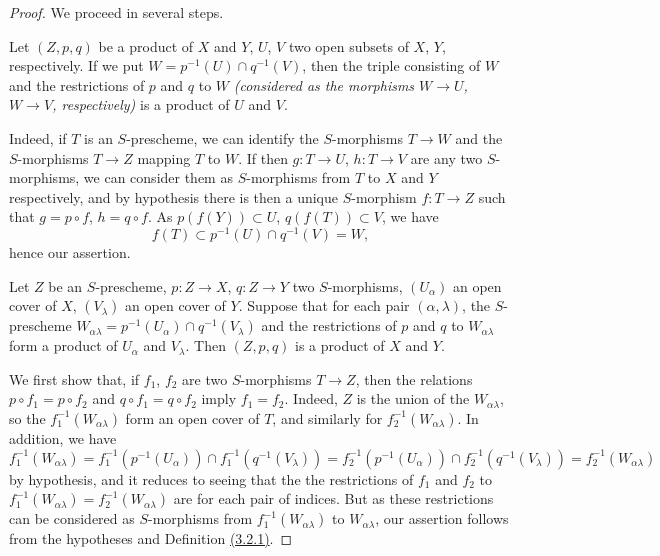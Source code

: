 \begin{proof}
\label{proof-thm-1.3.2.6}
We proceed in several steps.

\begin{lem}[3.2.6.1]
\label{lem-1.3.2.6.1}
Let $(Z,p,q)$ be a product of $X$ and $Y$, $U$, $V$ two open subsets of $X$, $Y$,
respectively. If we put $W=p^{-1}(U)\cap q^{-1}(V)$, then the triple consisting of $W$ and
the restrictions of $p$ and $q$ to $W$ {\it (considered as the morphisms $W\to U$, $W\to V$,
respectively)} is a product of $U$ and $V$.
\end{lem}

Indeed, if $T$ is an $S$-prescheme, we can identify the $S$-morphisms $T\to W$ and the
$S$-morphisms $T\to Z$ mapping $T$ to $W$. If then $g:T\to U$, $h:T\to V$ are any two
$S$-morphisms, we can consider them as $S$-morphisms from $T$ to $X$ and $Y$ respectively,
and by hypothesis there is then a unique $S$-morphism $f:T\to Z$ such that $g=p\circ f$,
$h=q\circ f$. As $p(f(Y))\subset U$, $q(f(T))\subset V$, we have
\[
  f(T)\subset p^{-1}(U)\cap q^{-1}(V)=W,
\]
hence our assertion.

\begin{lem}[3.2.6.2]
\label{lem-1.3.2.6.2}
Let $Z$ be an $S$-prescheme, $p:Z\to X$, $q:Z\to Y$ two $S$-morphisms, $(U_\alpha)$ an open
cover of $X$, $(V_\lambda)$ an open cover of $Y$. Suppose that for each pair
$(\alpha,\lambda)$, the $S$-prescheme
$W_{\alpha\lambda}=p^{-1}(U_\alpha)\cap q^{-1}(V_\lambda)$ and the restrictions of $p$ and
$q$ to $W_{\alpha\lambda}$ form a product of $U_\alpha$ and $V_\lambda$. Then $(Z,p,q)$ is a
product of $X$ and $Y$.
\end{lem}

We first show that, if $f_1$, $f_2$ are two $S$-morphisms $T\to Z$, then the relations
$p\circ f_1=p\circ f_2$ and $q\circ f_1=q\circ f_2$ imply $f_1=f_2$. Indeed, $Z$ is the union
of the $W_{\alpha\lambda}$, so the $f_1^{-1}(W_{\alpha\lambda})$ form an open cover of $T$,
and similarly for $f_2^{-1}(W_{\alpha\lambda})$. In addition, we have
\[
  f_1^{-1}(W_{\alpha\lambda})=f_1^{-1}(p^{-1}(U_\alpha))\cap f_1^{-1}(q^{-1}(V_\lambda))
  =f_2^{-1}(p^{-1}(U_\alpha))\cap f_2^{-1}(q^{-1}(V_\lambda))=f_2^{-1}(W_{\alpha\lambda})
\]
by hypothesis, and it reduces to seeing that the the restrictions of $f_1$ and $f_2$ to
$f_1^{-1}(W_{\alpha\lambda})=f_2^{-1}(W_{\alpha\lambda})$ are  for each pair of
indices. But as these restrictions can be considered as $S$-morphisms from
$f_1^{-1}(W_{\alpha\lambda})$ to $W_{\alpha\lambda}$, our assertion follows from the
hypotheses and Definition \hyperref[defn-1.3.2.1]{(3.2.1)}.


\end{proof}
